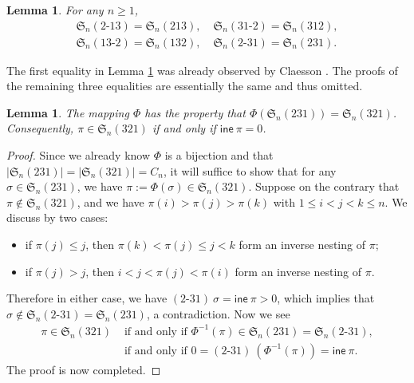 \documentclass[12pt,reqno]{amsart}
\numberwithin{equation}{section}
\theoremstyle{plain}
\newtheorem{lemma}[theorem]{Lemma}
\theoremstyle{definition}
\def\S{\mathfrak{S}}
\def\ine{\mathsf{ine}}
\def\cab{31\text{-}2}
\def\bca{2\text{-}31}
\def\acb{13\text{-}2}
\def\bac{2\text{-}13}
\begin{document}
\begin{lemma}\label{231-321}
For any $n\geq1$,
\begin{align*}
\S_n(\bac)=\S_n(213),\; &\S_n(\cab)=\S_n(312), \\
\S_n(\acb)=\S_n(132),\; &\S_n(\bca)=\S_n(231).
\end{align*}
\end{lemma}
The first equality in Lemma \ref{231-321} was already observed by Claesson \cite{Cla}. The proofs of the remaining three equalities are essentially the same and thus omitted.

\begin{lemma}\label{321-iff-ine=0}
The mapping $\varPhi$ has the property that  $\varPhi(\S_{n}(231))=\S_n(321)$. Consequently, $\pi\in\S_n(321)$ if and only if $\ine\:\pi=0$.
\end{lemma}

\begin{proof}
Since we already know $\varPhi$ is a bijection and that $|\S_n(231)|=|\S_n(321)|=C_n$, it will suffice to show that for any $\sigma\in\S_n(231)$, we have $\pi:=\varPhi(\sigma)\in\S_n(321)$. Suppose on the contrary that $\pi\not\in\S_n(321)$, and we have $\pi(i)>\pi(j)>\pi(k)$ with $1\le i<j<k\le n$. We discuss by two cases:
\begin{itemize}
    \item if $\pi(j)\le j$, then $\pi(k)<\pi(j)\le j<k$ form an inverse nesting of $\pi$;
    \item if $\pi(j)> j$, then $i<j< \pi(j)<\pi(i)$ form an inverse nesting of $\pi$.
\end{itemize}
Therefore in either case, we have $(\bca)\:\sigma=\ine\:\pi>0$, which implies that $\sigma\not\in \S_n(\bca)=\S_n(231)$, a contradiction. Now we see
\begin{align*}
\pi\in\S_n(321) & \text{ if and only if } \varPhi^{-1}(\pi)\in\S_n(231)=\S_n(\bca),\\
& \text{ if and only if } 0=(\bca)\:(\varPhi^{-1}(\pi)) = \ine\: \pi.
\end{align*}
The proof is now completed.
\end{proof}
\end{document}

